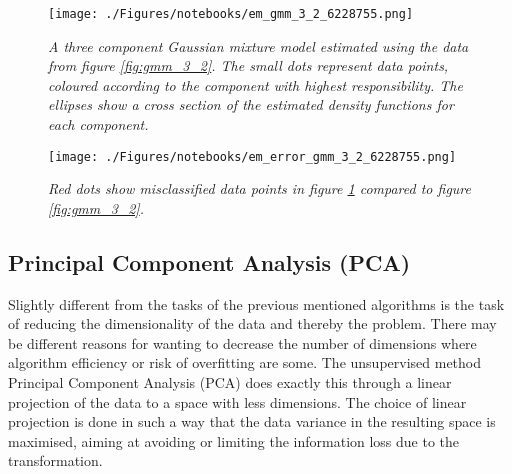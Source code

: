 \begin{figure}[h!t]
  \begin{minipage}[b]{\linewidth}
    \centering
    \texttt{[image: ./Figures/notebooks/em\_gmm\_3\_2\_6228755.png]}
    \caption{\small{\emph{A three component Gaussian mixture model estimated using the data from figure \ref{fig:gmm_3_2}. The small dots represent data points, coloured according to the component with highest responsibility. The ellipses show a cross section of the estimated density functions for each component.}}}
  \label{fig:em_gmm_3_2}
  \end{minipage}
\end{figure}

\begin{figure}[h!t]
  \begin{minipage}[b]{\linewidth}
    \centering
    \texttt{[image: ./Figures/notebooks/em\_error\_gmm\_3\_2\_6228755.png]}
    \caption{\small{\emph{Red dots show misclassified data points in figure \ref{fig:em_gmm_3_2} compared to figure \ref{fig:gmm_3_2}.}}}
  \label{fig:em_error_gmm_3_2}
  \end{minipage}
\end{figure}

\subsection{Principal Component Analysis (PCA)}
Slightly different from the tasks of the previous mentioned algorithms is the task of reducing the dimensionality of the data and thereby the problem. There may be different reasons for wanting to decrease the number of dimensions where algorithm efficiency or risk of overfitting are some. The unsupervised method Principal Component Analysis (PCA) does exactly this through a linear projection of the data to a space with less dimensions. The choice of linear projection is done in such a way that the data variance in the resulting space is maximised, aiming at avoiding or limiting the information loss due to the transformation. \parencite{Alpaydin2010}

